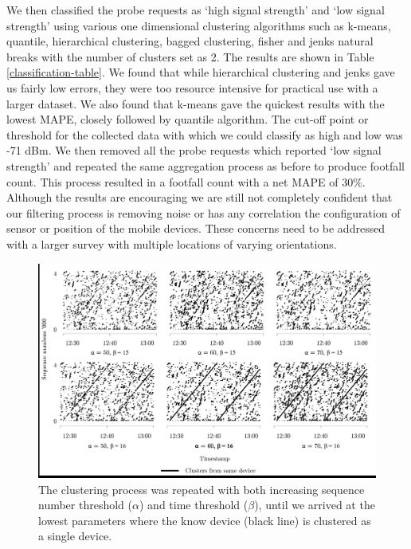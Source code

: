 We then classified the probe requests as `high signal strength' and `low signal
strength' using various one dimensional clustering algorithms such as k-means,
quantile, hierarchical clustering, bagged clustering, fisher and jenks natural
breaks with the number of clusters set as 2. The results are shown in Table
\ref{classification-table}. We found that while hierarchical clustering and
jenks gave us fairly low errors, they were too resource intensive for practical
use with a larger dataset. We also found that k-means gave the quickest results
with the lowest MAPE, closely followed by quantile algorithm. The cut-off point
or threshold for the collected data with which we could classify as high and
low was -71 dBm. We then removed all the probe requests which reported `low
signal strength' and repeated the same aggregation process as before to produce
footfall count. This process resulted in a footfall count with a net MAPE of
30\%. Although the results are encouraging we are still not completely
confident that our filtering process is removing noise or has any correlation
the configuration of sensor or position of the mobile devices. These concerns
need to be addressed with a larger survey with multiple locations of varying
orientations.

\begin{figure}
\begin{center}
\includegraphics [width=\linewidth,trim=1 1.5 1 1.5,clip]
    {images/figure_3.jpeg}
\caption{The clustering process was repeated with both increasing sequence
    number threshold ($\alpha$) and time threshold ($\beta$), until we arrived
    at the lowest parameters where the know device (black line) is clustered as
    a single device.}
\label{pilot_clustering_params}
\end{center}
\end{figure}

